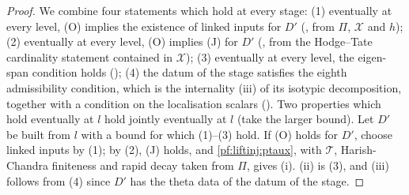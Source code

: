 \begin{proof}
We combine four statements which hold at every stage: (1) eventually at every level, (O) implies the existence of linked inputs for $D'$
(, from $\Pi$, $\mathcal X$ and $h$); (2) eventually at every level, (O) implies (J) for $D'$
(, from the Hodge--Tate cardinality statement contained in $\mathcal X$);
(3) eventually at every level, the eigen-span condition holds (); (4) the datum
of the stage satisfies the eighth admissibility condition, which is the internality (iii) of its isotypic decomposition, together with a condition on the
localisation scalars (). Two properties which hold eventually at $l$ hold jointly
eventually at $l$ (take the larger bound). Let $D'$ be built from $l$ with
a bound for which (1)--(3) hold. If (O) holds for $D'$, choose linked inputs by (1); by (2), (J) holds, and \cref{pf:liftinj:ptaux}, with $\mathcal T$,
Harish-Chandra finiteness and rapid decay taken from $\Pi$, gives (i). (ii) is (3), and (iii) follows from (4) since $D'$ has the theta data of the datum of
the stage.
\end{proof}
